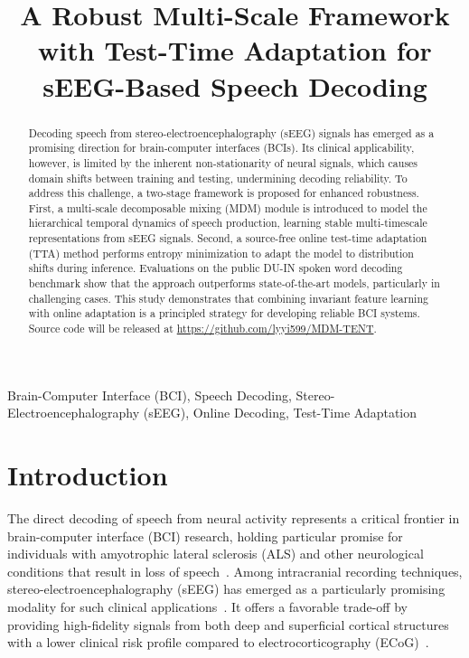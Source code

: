 \documentclass{article}
\title{A Robust Multi-Scale Framework with Test-Time Adaptation for sEEG-Based Speech Decoding}
\begin{document}
\maketitle

\begingroup
\renewcommand\thefootnote{}
\endgroup

\begin{abstract}
Decoding speech from stereo-electroencephalography (sEEG) signals has emerged as a promising direction for brain-computer interfaces (BCIs). Its clinical applicability, however, is limited by the inherent non-stationarity of neural signals, which causes domain shifts between training and testing, undermining decoding reliability. To address this challenge, a two-stage framework is proposed for enhanced robustness. First, a multi-scale decomposable mixing (MDM) module is introduced to model the hierarchical temporal dynamics of speech production, learning stable multi-timescale representations from sEEG signals. Second, a source-free online test-time adaptation (TTA) method performs entropy minimization to adapt the model to distribution shifts during inference. Evaluations on the public DU-IN spoken word decoding benchmark show that the approach outperforms state-of-the-art models, particularly in challenging cases. This study demonstrates that combining invariant feature learning with online adaptation is a principled strategy for developing reliable BCI systems. Source code will be released at \url{https://github.com/lyyi599/MDM-TENT}.
\end{abstract}


\begin{keywords}
Brain-Computer Interface (BCI), Speech Decoding, Stereo-Electroencephalography (sEEG), Online Decoding, Test-Time Adaptation
\end{keywords}


\section{Introduction}
The direct decoding of speech from neural activity represents a critical frontier in brain-computer interface (BCI) research, holding particular promise for individuals with amyotrophic lateral sclerosis (ALS) and other neurological conditions that result in loss of speech~\cite{metzger2023high,cho2023neural}. Among intracranial recording techniques, stereo-electroencephalography (sEEG) has emerged as a particularly promising modality for such clinical applications~\cite{he2025vocalmind}. It offers a favorable trade-off by providing high-fidelity signals from both deep and superficial cortical structures with a lower clinical risk profile compared to electrocorticography (ECoG)~\cite{miller2020current}.
\end{document}
